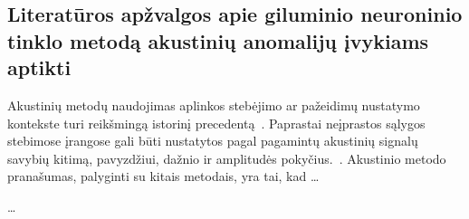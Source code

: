 \subsection*{Literatūros apžvalgos apie giluminio neuroninio tinklo metodą akustinių anomalijų įvykiams aptikti}\label{chap:onelt}
Akustinių metodų naudojimas aplinkos stebėjimo ar pažeidimų nustatymo kontekste turi reikšmingą istorinį precedentą~\cite{Simonovic2021, Vicuna2017}. Paprastai neįprastos sąlygos stebimose įrangose gali būti nustatytos pagal pagamintų akustinių signalų savybių kitimą, pavyzdžiui, dažnio ir amplitudės pokyčius.~\cite{Holford2017, Cooper2020}. Akustinio metodo pranašumas, palyginti su kitais metodais, yra tai, kad \dots

\dots
